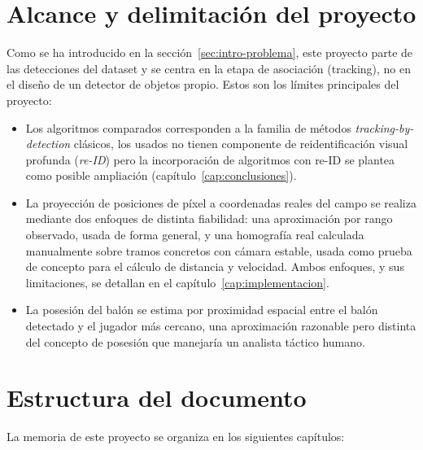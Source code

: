 \section{Alcance y delimitación del proyecto}
\label{sec:intro-alcance}

Como se ha introducido en la sección~\ref{sec:intro-problema}, este proyecto
parte de las detecciones del dataset y se centra en la etapa de
asociación (tracking), no en el diseño de un detector de objetos propio. Estos son
 los límites principales del proyecto:

\begin{itemize}
  \item Los algoritmos comparados corresponden a la familia de métodos
        \emph{tracking-by-detection} clásicos, los usados no tienen componente de
        reidentificación visual profunda (\emph{re-ID}) pero la incorporación de
        algoritmos con re-ID se plantea como posible ampliación
        (capítulo~\ref{cap:conclusiones}).
  \item La proyección de posiciones de píxel a coordenadas reales del campo
        se realiza mediante dos enfoques de distinta fiabilidad: una
        aproximación por rango observado, usada
        de forma general, y una homografía real calculada manualmente sobre
        tramos concretos con cámara estable, usada como prueba de concepto
        para el cálculo de distancia y velocidad. Ambos enfoques, y sus
        limitaciones, se detallan en el capítulo~\ref{cap:implementacion}.
  \item La posesión del balón se estima por proximidad espacial entre el
        balón detectado y el jugador más cercano, una aproximación razonable
        pero distinta del concepto de posesión que manejaría un analista
        táctico humano.
\end{itemize}

\section{Estructura del documento}
\label{sec:intro-estructura}

La memoria de este proyecto se organiza en los siguientes capítulos:

